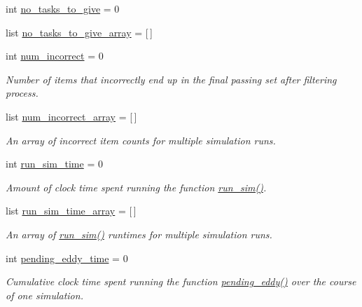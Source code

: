 \begin{DoxyCompactItemize}
int \hyperlink{classdynamicfilterapp_1_1test__simulations_1_1_simulation_test_a50859596b592ecea7447a51ab83209d1}{no\+\_\+tasks\+\_\+to\+\_\+give} = 0
\item 
list \hyperlink{classdynamicfilterapp_1_1test__simulations_1_1_simulation_test_aca05845f48ed602774413566dcbed8ee}{no\+\_\+tasks\+\_\+to\+\_\+give\+\_\+array} = \mbox{[}$\,$\mbox{]}
\item 
int \hyperlink{classdynamicfilterapp_1_1test__simulations_1_1_simulation_test_ac8f769f7a743d3c6bb9e29cdc01a67b1}{num\+\_\+incorrect} = 0
\begin{DoxyCompactList}\small\item\em Number of items that incorrectly end up in the final passing set after filtering process. \end{DoxyCompactList}\item 
list \hyperlink{classdynamicfilterapp_1_1test__simulations_1_1_simulation_test_ae04fa3a990d11de4cda2e4d61a4d4756}{num\+\_\+incorrect\+\_\+array} = \mbox{[}$\,$\mbox{]}
\begin{DoxyCompactList}\small\item\em An array of incorrect item counts for multiple simulation runs. \end{DoxyCompactList}\item 
int \hyperlink{classdynamicfilterapp_1_1test__simulations_1_1_simulation_test_a3ef3670fbfd221b5d98a34fceba93c19}{run\+\_\+sim\+\_\+time} = 0
\begin{DoxyCompactList}\small\item\em Amount of clock time spent running the function \hyperlink{classdynamicfilterapp_1_1test__simulations_1_1_simulation_test_aafbc405f49645141a30302a448b056dc}{run\+\_\+sim()}. \end{DoxyCompactList}\item 
list \hyperlink{classdynamicfilterapp_1_1test__simulations_1_1_simulation_test_a26bec4b04005dffaddd57bdcd42249f3}{run\+\_\+sim\+\_\+time\+\_\+array} = \mbox{[}$\,$\mbox{]}
\begin{DoxyCompactList}\small\item\em An array of \hyperlink{classdynamicfilterapp_1_1test__simulations_1_1_simulation_test_aafbc405f49645141a30302a448b056dc}{run\+\_\+sim()} runtimes for multiple simulation runs. \end{DoxyCompactList}\item 
int \hyperlink{classdynamicfilterapp_1_1test__simulations_1_1_simulation_test_a059ceb58f40a64c850d6a7e78752145b}{pending\+\_\+eddy\+\_\+time} = 0
\begin{DoxyCompactList}\small\item\em Cumulative clock time spent running the function \hyperlink{namespacedynamicfilterapp_1_1views__helpers_ad11bcb9737901ab723493b4f7fe09329}{pending\+\_\+eddy()} over the course of one simulation. \end{DoxyCompactList}\item 

\end{DoxyCompactItemize}
